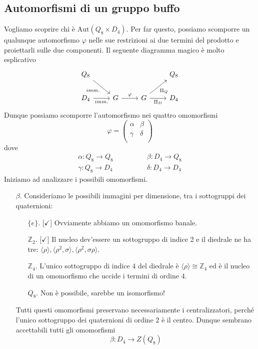 \documentclass[a4paper]{article}
\theoremstyle{remark}
\theoremstyle{definition}
\newcommand{\Aut}[1]{\mathrm{Aut}\left( #1 \right)}
\begin{document}
\subsection{Automorfismi di un gruppo buffo}
\begin{multicols}{2}
	Vogliamo scoprire chi è $ \Aut{Q_8 \times D_4} $. Per far questo, possiamo scomporre un qualunque automorfismo $ \varphi $ nelle sue restrizioni ai due termini del prodotto e proiettarli sulle due componenti. Il seguente diagramma magico è molto esplicativo
	\[ \begin{tikzcd}
	Q_8 \arrow[swap]{dr}{imm.
	} & & & Q_8 \\
	D_4 \arrow[swap]{r}{imm.} & G \arrow{r}{\varphi} & G \arrow[swap]{ur}{\Pi_Q}\arrow[swap]{r}{\Pi_D} & D_4
	\end{tikzcd}\]
	Dunque possiamo scomporre l'automorfismo nei quattro omomorfismi
	\[ \varphi= \left(\begin{matrix}
	\alpha & \beta \\
	\gamma & \delta \\
	\end{matrix}\right) \]
	dove 
	\begin{align*}
		\alpha: Q_8 \rightarrow Q_8 \qquad & \qquad \beta: D_4 \rightarrow Q_8 \\
		\gamma: Q_8 \rightarrow D_4 \qquad & \qquad \delta: D_4 \rightarrow D_4
	\end{align*}
	 Iniziamo ad analizzare i possibili omomorfismi.
	 \begin{itemize}
	 	\item [$ \beta $.] Consideriamo le possibili immagini per dimensione, tra i sottogruppi dei quaternioni:
	 	\begin{itemize}
	 		\item [$\{e\}  $.][$ \checkmark $] Ovviamente abbiamo un omomorfismo banale.
	 		\item [$ \mathbb{Z}_2 $.][$ \checkmark $] Il nucleo dev'essere un sottogruppo di indice 2 e il diedrale ne ha tre: $ \langle \rho \rangle, \langle \rho^2, \sigma \rangle, \langle \rho^2, \sigma\rho \rangle $.
	 		\item [$ \mathbb{Z}_4 $.] L'unico sottogruppo di indice $ 4 $ del diedrale è $ \langle \rho \rangle \cong \mathbb{Z}_4 $ ed è il nucleo di un omomorfismo che uccide i termini di ordine $ 4 $.
	 		\item [$ Q_8 $.] Non è possibile, sarebbe un isomorfismo!
	 	\end{itemize}
	 	Tutti questi omomorfismi preservano necessariamente i centralizzatori, perché l'unico sottogruppo dei quaternioni di ordine $ 2 $ è il centro. Dunque sembrano accettabili tutti gli omomorfismi
	 	\[ \beta: D_4 \to Z(Q_8) \]
	 	

\end{itemize}
\end{multicols}
\end{document}

